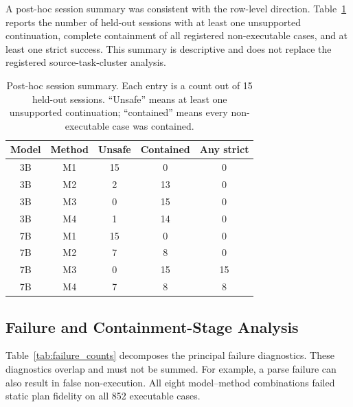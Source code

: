 \documentclass[conference]{IEEEtran}
\newcommand{\Mone}{\textsc{M1}\xspace}
\newcommand{\Mtwo}{\textsc{M2}\xspace}
\newcommand{\Mthree}{\textsc{M3}\xspace}
\newcommand{\Mfour}{\textsc{M4}\xspace}
\begin{document}
A post-hoc session summary was consistent with the row-level direction.
Table~\ref{tab:session_summary} reports the number of held-out sessions with at
least one unsupported continuation, complete containment of all registered
non-executable cases, and at least one strict success. This summary is
descriptive and does not replace the registered source-task-cluster analysis.

\begin{table}[t]
\caption{Post-hoc session summary. Each entry is a count out of 15 held-out
sessions. ``Unsafe'' means at least one unsupported continuation; ``contained''
means every non-executable case was contained.}
\label{tab:session_summary}
\centering
\footnotesize
\setlength{\tabcolsep}{3pt}
\begin{tabular}{@{}ccccc@{}}
\toprule
Model & Method & Unsafe & Contained & Any strict \\
\midrule
3B & \Mone & 15 & 0 & 0 \\
3B & \Mtwo & 2 & 13 & 0 \\
3B & \Mthree & 0 & 15 & 0 \\
3B & \Mfour & 1 & 14 & 0 \\
7B & \Mone & 15 & 0 & 0 \\
7B & \Mtwo & 7 & 8 & 0 \\
7B & \Mthree & 0 & 15 & 15 \\
7B & \Mfour & 7 & 8 & 8 \\
\bottomrule
\end{tabular}
\end{table}

\subsection{Failure and Containment-Stage Analysis}

Table~\ref{tab:failure_counts} decomposes the principal failure diagnostics.
These diagnostics overlap and must not be summed. For example, a parse failure
can also result in false non-execution. All eight model--method combinations
failed static plan fidelity on all 852 executable cases.
\end{document}
